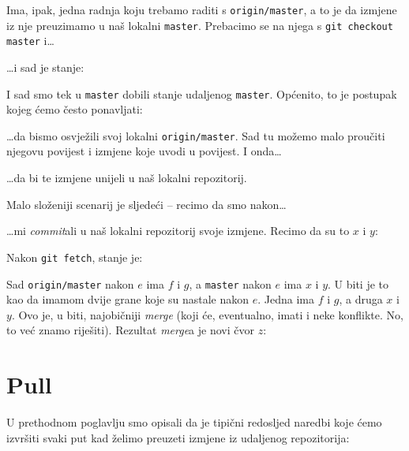 Ima, ipak, jedna radnja koju trebamo raditi s \verb+origin/master+, a to je da izmjene iz nje preuzimamo u naš lokalni \verb+master+.
Prebacimo se na njega s \verb+git checkout master+ i\dots{}


\dots{}i sad je stanje:



I sad smo tek u \verb+master+ dobili stanje udaljenog \verb+master+.
Općenito, to je postupak kojeg ćemo često ponavljati:


\dots{}da bismo osvježili svoj lokalni \verb+origin/master+.
Sad tu možemo malo proučiti njegovu povijest i izmjene koje uvodi u povijest.
I onda\dots


\dots{}da bi te izmjene unijeli u naš lokalni repozitorij.

Malo složeniji scenarij je sljedeći -- recimo da smo nakon\dots{}



\dots{}mi \emph{commit}ali u naš lokalni repozitorij svoje izmjene. Recimo da su to $x$ i $y$:



Nakon \verb+git fetch+, stanje je:



Sad \verb+origin/master+ nakon $e$ ima $f$ i $g$, a \verb+master+ nakon $e$ ima $x$ i $y$.
U biti je to kao da imamom dvije grane koje su nastale nakon $e$. Jedna ima $f$ i $g$, a druga $x$ i $y$.
Ovo je, u biti, najobičniji \emph{merge} (koji će, eventualno, imati i neke konflikte. No, to već znamo riješiti).
Rezultat \emph{merge}a je novi čvor $z$:



\section*{Pull}

U prethodnom poglavlju smo opisali da je tipični redosljed naredbi koje ćemo izvršiti svaki put kad želimo preuzeti izmjene iz udaljenog repozitorija:


